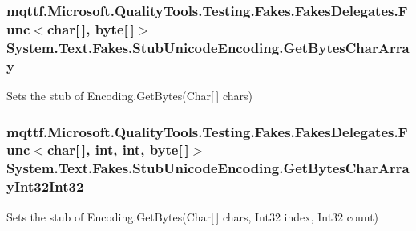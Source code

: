 \hypertarget{class_system_1_1_text_1_1_fakes_1_1_stub_unicode_encoding_a495e2d688e5169e61e559780b32fd046}{
\subsubsection[{Get\-Bytes\-Char\-Array}]{\setlength{\rightskip}{0pt plus 5cm}mqttf.\-Microsoft.\-Quality\-Tools.\-Testing.\-Fakes.\-Fakes\-Delegates.\-Func$<$char\mbox{[}$\,$\mbox{]}, byte\mbox{[}$\,$\mbox{]}$>$ System.\-Text.\-Fakes.\-Stub\-Unicode\-Encoding.\-Get\-Bytes\-Char\-Array}}\label{class_system_1_1_text_1_1_fakes_1_1_stub_unicode_encoding_a495e2d688e5169e61e559780b32fd046}


Sets the stub of Encoding.\-Get\-Bytes(\-Char\mbox{[}$\,$\mbox{]} chars)

\hypertarget{class_system_1_1_text_1_1_fakes_1_1_stub_unicode_encoding_a07ae9c07ebddadf44cf3fcc8be4a2f1e}{
\subsubsection[{Get\-Bytes\-Char\-Array\-Int32\-Int32}]{\setlength{\rightskip}{0pt plus 5cm}mqttf.\-Microsoft.\-Quality\-Tools.\-Testing.\-Fakes.\-Fakes\-Delegates.\-Func$<$char\mbox{[}$\,$\mbox{]}, int, int, byte\mbox{[}$\,$\mbox{]}$>$ System.\-Text.\-Fakes.\-Stub\-Unicode\-Encoding.\-Get\-Bytes\-Char\-Array\-Int32\-Int32}}\label{class_system_1_1_text_1_1_fakes_1_1_stub_unicode_encoding_a07ae9c07ebddadf44cf3fcc8be4a2f1e}


Sets the stub of Encoding.\-Get\-Bytes(\-Char\mbox{[}$\,$\mbox{]} chars, Int32 index, Int32 count)

